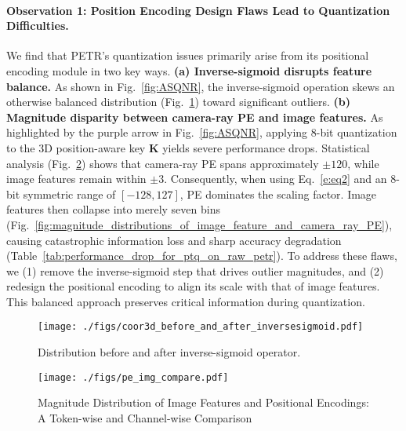 \paragraph{Observation 1: Position Encoding Design Flaws Lead to Quantization Difficulties.}
We find that PETR’s quantization issues primarily arise from its positional encoding module in two key ways. 
\textbf{(a) Inverse-sigmoid disrupts feature balance.} As shown in Fig.~\ref{fig:ASQNR}, the inverse-sigmoid operation skews an otherwise balanced distribution (Fig.~\ref{fig:distribution_before_and_after_insigmoid}) toward significant outliers. 
\textbf{(b) Magnitude disparity between camera-ray PE and image features.} As highlighted by the purple arrow in Fig.~\ref{fig:ASQNR}, applying 8-bit quantization to the 3D position-aware key $\mathbf{K}$ yields severe performance drops. Statistical analysis (Fig.~\ref{fig:pe_img_compare}) shows that camera-ray PE spans approximately $\pm120$, while image features remain within $\pm3$. Consequently, when using Eq.~\ref{e:eq2} and an 8-bit symmetric range of $[-128,127]$, PE dominates the scaling factor. Image features then collapse into merely seven bins (Fig.~\ref{fig:magnitude_distributions_of_image_feature_and_camera_ray_PE}), causing catastrophic information loss and sharp accuracy degradation (Table~\ref{tab:performance_drop_for_ptq_on_raw_petr}). To address these flaws, we (1) remove the inverse-sigmoid step that drives outlier magnitudes, and (2) redesign the positional encoding to align its scale with that of image features. This balanced approach preserves critical information during quantization.


\begin{figure}[htb]
\vspace{-3mm}
\centering
	\texttt{[image: ./figs/coor3d\_before\_and\_after\_inversesigmoid.pdf]}
    \vspace{-0.6cm}
	\caption{Distribution before and after inverse-sigmoid operator.}
	\label{fig:distribution_before_and_after_insigmoid}
    \vspace{-0.3cm}
\end{figure}

\begin{figure}[htb]
\vspace{-2mm}
\centering
	\texttt{[image: ./figs/pe\_img\_compare.pdf]}
    \vspace{-0.6cm}
	\caption{Magnitude Distribution of Image Features and Positional Encodings: A Token-wise and Channel-wise Comparison}
	\label{fig:pe_img_compare}
    \vspace{-0.3cm}
\end{figure}


